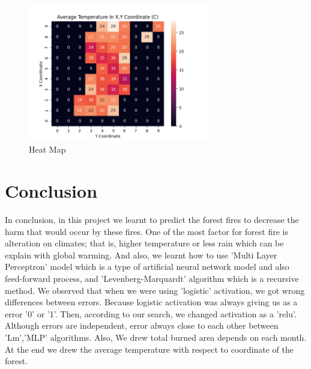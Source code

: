 \documentclass[onecolumn]{article}
\begin{document}
\begin{figure}[htb!]
\centerline
{\includegraphics[width=80mm,scale=1.0]{heatMap.png}}
\caption{Heat Map}
\end{figure}


\section{Conclusion}
In conclusion, in this project we learnt to predict the forest fires to decrease the harm that would occur by these fires. One of the most factor for forest fire is alteration on climates; that is, higher temperature or less rain which can be explain with global warming. And also, we learnt how to use 'Multi Layer Perceptron' model which is a type of artificial neural network model and also feed-forward process, and 'Levenberg-Marquardt' algorithm which is a recursive method. We observed that when we were using 'logistic' activation, we got wrong  differences between errors. Because logistic activation was always giving us as a error '0' or '1'. Then, according to our search, we changed activation as a 'relu'. Although errors are independent, error always close to each other between 'Lm','MLP' algorithms. Also, We drew total burned area depends on each month. At the end we drew the average temperature with respect to coordinate of the forest.
\end{document}
